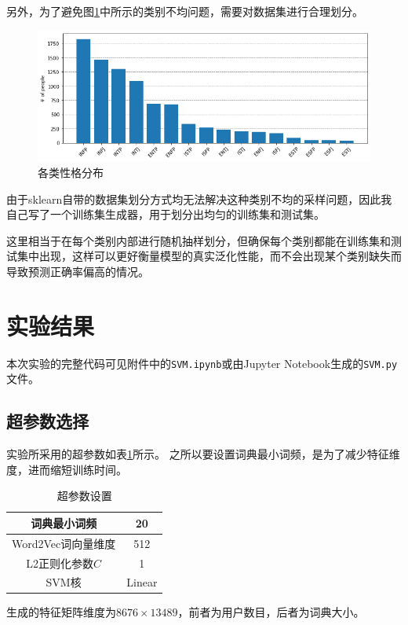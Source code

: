 \documentclass[logo,reportComp]{thesis}
\begin{document}
另外，为了避免图\ref{fig:distribution}中所示的类别不均问题，需要对数据集进行合理划分。
\begin{figure}[H]
\centering
\includegraphics[width=0.9\linewidth]{../report/fig/distribution.png}
\caption{各类性格分布}
\label{fig:distribution}
\end{figure}

由于sklearn自带的数据集划分方式均无法解决这种类别不均的采样问题，因此我自己写了一个训练集生成器，用于划分出均匀的训练集和测试集。



这里相当于在每个类别内部进行随机抽样划分，但确保每个类别都能在训练集和测试集中出现，这样可以更好衡量模型的真实泛化性能，而不会出现某个类别缺失而导致预测正确率偏高的情况。

\section{实验结果}
本次实验的完整代码可见附件中的\verb'SVM.ipynb'或由Jupyter Notebook生成的\verb'SVM.py'文件。

\subsection{超参数选择}
实验所采用的超参数如表\ref{tab:hyperparam}所示。
之所以要设置词典最小词频，是为了减少特征维度，进而缩短训练时间。
\begin{table}[H]
\caption{超参数设置}
\label{tab:hyperparam}
\centering
\begin{tabular}{|c|c|}\hline
词典最小词频 & 20 \\\hline
Word2Vec词向量维度 & 512 \\\hline
L2正则化参数$C$ & 1\\\hline
SVM核 & Linear\\\hline
\end{tabular}
\end{table}

生成的特征矩阵维度为$8676\times 13489$，前者为用户数目，后者为词典大小。
\end{document}
